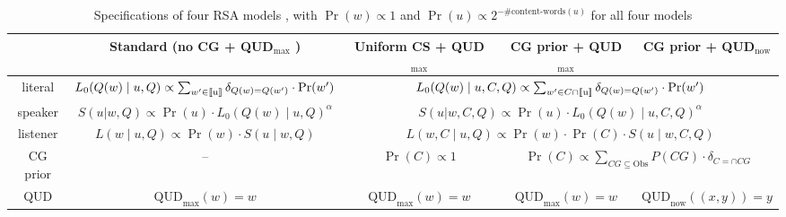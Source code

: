 \begin{table}
\centering
\begin{tabular}{c|c|c|c|c}
         & Standard (no CG + QUD$_\text{max}$ ) & Uniform CS + QUD$_\text{max}$ & CG prior + QUD$_\text{max}$ & CG prior + QUD$_\text{now}$ \\ \hline 
literal  & $L_0(Q(w) \mid u, Q) \propto  \sum_{w'\in \llbracket \text{u} \rrbracket} \delta_{Q(w)=Q(w')} \cdot \Pr(w') $ & 
\multicolumn{3}{c}{$L_0(Q(w) \mid u, C, Q) \propto  \sum_{w'\in C\cap \llbracket \text{u} \rrbracket} \delta_{Q(w)=Q(w')} \cdot \Pr(w')$} \\
speaker  & $S(u | w, Q) \propto \Pr(u) \cdot L_0(Q(w) \mid u, Q)^\alpha $ & \multicolumn{3}{c}{$S(u | w, C, Q) \propto \Pr(u) \cdot L_0(Q(w) \mid u, C, Q)^\alpha$} \\
listener & $L(w \mid u, Q) \propto \Pr(w) \cdot S(u \mid w, Q)$ & \multicolumn{3}{c}{$L(w, C \mid u, Q) \propto \Pr(w) \cdot \Pr(C) \cdot S(u \mid w, C, Q)$} \\
CG prior & -- & $\Pr(C) \propto 1$ & \multicolumn{2}{c}{$\Pr(C) \propto \sum_{CG\subseteq\text{Obs}} P(CG) \cdot \delta_{C=\cap CG}$}\\
QUD      & $\text{QUD}_\text{max}(w)=w$ & $\text{QUD}_\text{max}(w)=w$ & $\text{QUD}_\text{max}(w)=w$ & $\text{QUD}_\text{now}((x,y))=y$\\
\hline
\end{tabular}
\vspace{-1ex}
\caption{Specifications of four RSA models \label{tab:models}, with $\Pr(w)\propto1$ and $\Pr(u) \propto 2^{-\#\textrm{content-words}(u)}$ for all four models}
\vspace{-2ex}
\end{table} 
 
